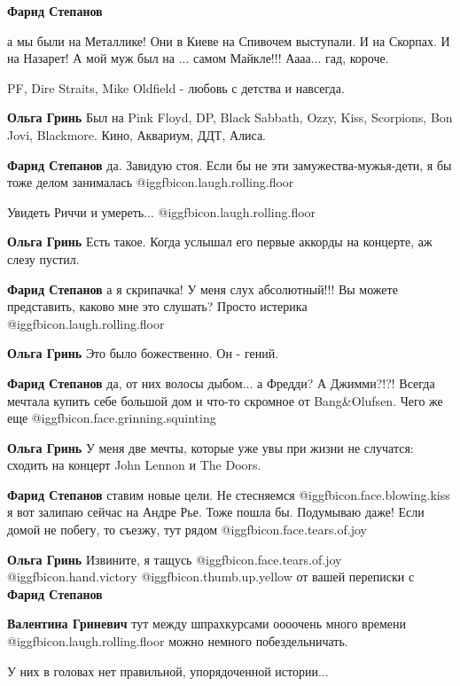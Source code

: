 \begin{itemize}
\begin{itemize}
\textbf{Фарид Степанов} 

а мы были на Металлике! Они в Киеве на Спивочем выступали. И на Скорпах. И на
Назарет! А мой муж был на ... самом Майкле!!! Аааа... гад, короче.

PF, Dire Straits, Mike Oldfield - любовь с детства и навсегда.


\textbf{Ольга Гринь}
Был на Pink Floyd, DP, Black Sabbath, Ozzy, Kiss, Scorpions, Bon Jovi, Blackmore.
Кино, Аквариум, ДДТ, Алиса.

\textbf{Фарид Степанов} да. Завидую стоя. Если бы не эти замужества-мужья-дети, я бы тоже делом занималась @igg{fbicon.laugh.rolling.floor} 

Увидеть Риччи и умереть... @igg{fbicon.laugh.rolling.floor} 

\textbf{Ольга Гринь}
Есть такое.
Когда услышал его первые аккорды на концерте, аж слезу пустил.

\textbf{Фарид Степанов} а я скрипачка! У меня слух абсолютный!!! Вы можете представить, каково мне это слушать? Просто истерика @igg{fbicon.laugh.rolling.floor} 

\textbf{Ольга Гринь}
Это было божественно. Он - гений.

\textbf{Фарид Степанов} да, от них волосы дыбом... а Фредди? А Джимми?!?! Всегда мечтала купить себе большой дом и что-то скромное от Bang&Olufsen. Чего же еще @igg{fbicon.face.grinning.squinting} 

\textbf{Ольга Гринь}
У меня две мечты, которые уже увы при жизни не случатся: сходить на концерт John Lennon и The Doors.

\textbf{Фарид Степанов} ставим новые цели. Не стесняемся @igg{fbicon.face.blowing.kiss}  я вот залипаю сейчас на Андре Рье. Тоже пошла бы. Подумываю даже! Если домой не побегу, то съезжу, тут рядом @igg{fbicon.face.tears.of.joy} 

\textbf{Ольга Гринь} Извините, я тащусь @igg{fbicon.face.tears.of.joy} @igg{fbicon.hand.victory}  @igg{fbicon.thumb.up.yellow}  от вашей переписки с \textbf{Фарид Степанов}

\textbf{Валентина Гриневич} тут между шпрахкурсами оооочень много времени @igg{fbicon.laugh.rolling.floor}  можно немного побездельничать.

У них в головах нет правильной, упорядоченной истории...


\end{itemize}
\end{itemize}

